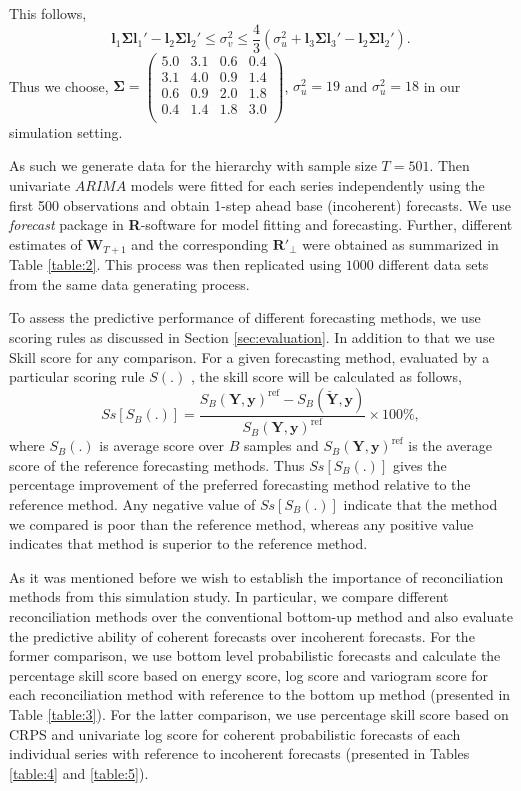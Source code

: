 \documentclass[a4paper, 11pt]{article}
\begin{document}
	This follows,
	$$\bm{l}_1\bm{\Sigma} \bm{l}_1' - \bm{l}_2\bm{\Sigma} \bm{l}_2' \le \sigma^2_v \le \frac{4}{3}(\sigma^2_u + \bm{l}_3\bm{\Sigma} \bm{l}_3' - \bm{l}_2\bm{\Sigma} \bm{l}_2').$$
	Thus we choose,
	$\bm{\Sigma} =
	\begin{pmatrix}
	5.0 & 3.1 & 0.6 & 0.4 \\
	3.1 & 4.0 & 0.9 & 1.4 \\
	0.6 & 0.9 & 2.0 & 1.8 \\
	0.4 & 1.4 & 1.8 & 3.0 \\
	\end{pmatrix}$,
	$\sigma^2_u = 19$ and $\sigma^2_u = 18$ in our simulation setting.
	
	As such we generate data for the hierarchy with sample size $T=501$. Then univariate $ARIMA$ models were fitted for each series independently using the first 500 observations and obtain 1-step ahead base (incoherent) forecasts. We use \textit{forecast} package in \textbf{R}-software \citet{hyndman2017forecasting} for model fitting and forecasting. Further, different estimates of $\bm{W}_{T+1}$ and the corresponding $\bm{R}'_\bot$ were obtained as summarized in Table \ref{table:2}. This process was then replicated using $1000$ different data sets from the same data generating process.
	
	To assess the predictive performance of different forecasting methods, we use scoring rules as discussed in Section \ref{sec:evaluation}. In addition to that we use Skill score \citep{Gneiting2007} for any comparison. For a given forecasting method, evaluated by a particular scoring rule $S(.)$ , the skill score will be calculated as follows,
	\begin{equation}
	Ss[S_B(.)] = \frac{S_B(\bm{Y},\bm{y})^{\text{ref}} - S_B(\bm{\breve{Y}},\bm{y})}{S_B(\bm{Y},\bm{y})^{\text{ref}}}\times 100\%,
	\end{equation}
	where $S_B(.)$ is average score over $B$ samples and $S_B(\bm{Y},\bm{y})^{\text{ref}}$ is the average score of the reference forecasting methods. Thus $Ss[S_B(.)]$ gives the percentage improvement of the preferred forecasting method relative to the reference method. Any negative value of $Ss[S_B(.)]$ indicate that the method we compared is poor than the reference method, whereas any positive value indicates that method is superior to the reference method.
	
	As it was mentioned before we wish to establish the importance of reconciliation methods from this simulation study. In particular, we compare different reconciliation methods over the conventional bottom-up method and also evaluate the predictive ability of coherent forecasts over incoherent forecasts. For the former comparison, we use bottom level probabilistic forecasts and calculate the percentage skill score based on energy score, log score and variogram score for each reconciliation method with reference to the bottom up method (presented in Table \ref{table:3}). For the latter comparison, we use percentage skill score based on CRPS and univariate log score for coherent probabilistic forecasts of each individual series with reference to incoherent forecasts (presented in Tables \ref{table:4} and \ref{table:5}).
	
\end{document}
